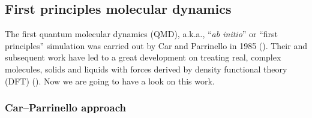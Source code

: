 
\subsection{First principles molecular dynamics}

The first quantum molecular dynamics (QMD),
a.k.a., ``\textit{ab initio}'' or ``first principles'' simulation was
carried out by Car and Parrinello in 1985 (\cite{Car:1985ix}).
Their and subsequent work
have led to a great development on treating real, complex molecules,
solids and liquids with forces derived by density functional theory
(DFT) (\cite{martin2004electronic}). Now we are going to have a look
on this work.


\subsubsection{Car--Parrinello approach}

